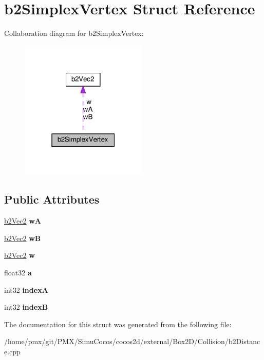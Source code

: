 \hypertarget{structb2SimplexVertex}{}\section{b2\+Simplex\+Vertex Struct Reference}
\label{structb2SimplexVertex}


Collaboration diagram for b2\+Simplex\+Vertex\+:
\nopagebreak
\begin{figure}[H]
\begin{center}
\leavevmode
\includegraphics[width=171pt]{structb2SimplexVertex__coll__graph}
\end{center}
\end{figure}
\subsection*{Public Attributes}
\begin{DoxyCompactItemize}
\item 
\mbox{\label{structb2SimplexVertex_a35098ec42d2615c7dc6d645e4a7c0674}} 
\hyperlink{structb2Vec2}{b2\+Vec2} {\bfseries wA}
\item 
\mbox{\label{structb2SimplexVertex_a73d6b5be3648a293b103d559e9d03534}} 
\hyperlink{structb2Vec2}{b2\+Vec2} {\bfseries wB}
\item 
\mbox{\label{structb2SimplexVertex_a32e374d7bbb6d8a0589a91bd3de3029f}} 
\hyperlink{structb2Vec2}{b2\+Vec2} {\bfseries w}
\item 
\mbox{\label{structb2SimplexVertex_ace99ab00d1d83a7290d283f73671e594}} 
float32 {\bfseries a}
\item 
\mbox{\label{structb2SimplexVertex_ac53c648f53d28391aaff758d99a7868d}} 
int32 {\bfseries indexA}
\item 
\mbox{\label{structb2SimplexVertex_a0c25e5f713707356122e91bd20e4f40c}} 
int32 {\bfseries indexB}
\end{DoxyCompactItemize}


The documentation for this struct was generated from the following file\+:\begin{DoxyCompactItemize}
\item 
/home/pmx/git/\+P\+M\+X/\+Simu\+Cocos/cocos2d/external/\+Box2\+D/\+Collision/b2\+Distance.\+cpp\end{DoxyCompactItemize}
